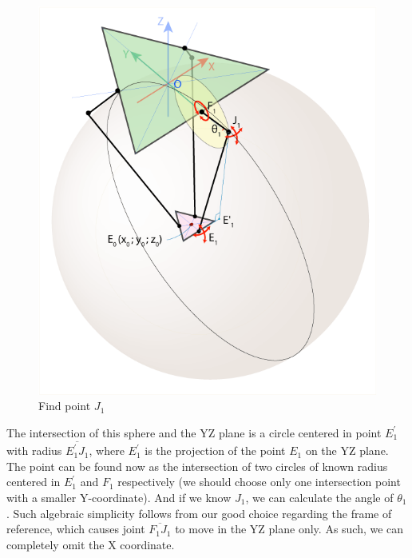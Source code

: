 \begin{figure}[H]
	\centering
	\includegraphics[width=\maxwidth{15cm}, keepaspectratio]{Chapters/Fig/find_point_J1.png}
	\caption{Find point $J_{1}$}
	\label{fig:find_point_J1}
\end{figure}
The intersection of this sphere and the YZ plane is a circle centered in point $E^{'}_{1}$ with radius $\overline{E^{'}_{1}J_{1}}$, where $E^{'}_{1}$ is the projection of the point $E_{1}$ on the YZ plane. The point can be found now as the intersection of two circles of known radius centered in $E^{'}_{1}$ and $F_{1}$ respectively (we should choose only one intersection point with a smaller Y-coordinate). And if we know $J_{1}$, we can calculate the angle of $\theta_{1}$.
Such algebraic simplicity follows from our good choice regarding the frame of reference, which causes joint $\overline{F_{1}J_{1}}$ to move in the YZ plane only. As such, we can completely omit the X coordinate.
